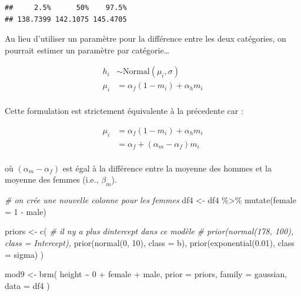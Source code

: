 \documentclass[
  a4paper,11pt,twoside,onecolumn,openright,final,oldfontcommands]{memoir}
\newenvironment{Shaded}{\begin{snugshade}}{\end{snugshade}}
\newcommand{\AttributeTok}[1]{\textcolor[rgb]{0.77,0.63,0.00}{#1}}
\newcommand{\CommentTok}[1]{\textcolor[rgb]{0.56,0.35,0.01}{\textit{#1}}}
\newcommand{\DecValTok}[1]{\textcolor[rgb]{0.00,0.00,0.81}{#1}}
\newcommand{\FloatTok}[1]{\textcolor[rgb]{0.00,0.00,0.81}{#1}}
\newcommand{\FunctionTok}[1]{\textcolor[rgb]{0.00,0.00,0.00}{#1}}
\newcommand{\NormalTok}[1]{#1}
\newcommand{\OtherTok}[1]{\textcolor[rgb]{0.56,0.35,0.01}{#1}}
\newcommand{\SpecialCharTok}[1]{\textcolor[rgb]{0.00,0.00,0.00}{#1}}
\theoremstyle{definition}
\theoremstyle{definition}
\theoremstyle{definition}
\theoremstyle{remark}
\begin{document}
\begin{verbatim}
##     2.5%      50%    97.5% 
## 138.7399 142.1075 145.4705
\end{verbatim}

Au lieu d'utiliser un paramètre pour la différence entre les deux catégories, on pourrait estimer un paramètre par catégorie\ldots{}

\[
\begin{aligned}
h_{i} &\sim \mathrm{Normal}(\mu_{i}, \sigma) \\
\mu_{i} &= \alpha_{f}(1 - m_{i}) + \alpha_{h} m_{i} \\
\end{aligned}
\]

Cette formulation est strictement équivalente à la précedente car :

\[
\begin{aligned}
\mu_{i} &= \alpha_{f}(1 - m_{i}) + \alpha_{h} m_{i} \\
&= \alpha_{f} + (\alpha_{m} - \alpha_{f}) m_{i} \\
\end{aligned}
\]

où \((\alpha_{m} - \alpha_{f})\) est égal à la différence entre la moyenne des hommes et la moyenne des femmes (i.e., \(\beta_{m}\)).

\begin{Shaded}
\begin{Highlighting}[]
\CommentTok{\# on crée une nouvelle colonne pour les femmes}
\NormalTok{df4 }\OtherTok{\textless{}{-}}\NormalTok{ df4 }\SpecialCharTok{\%\textgreater{}\%} \FunctionTok{mutate}\NormalTok{(}\AttributeTok{female =} \DecValTok{1} \SpecialCharTok{{-}}\NormalTok{ male)}

\NormalTok{priors }\OtherTok{\textless{}{-}} \FunctionTok{c}\NormalTok{(}
  \CommentTok{\# il n\textquotesingle{}y a plus d\textquotesingle{}intercept dans ce modèle}
  \CommentTok{\# prior(normal(178, 100), class = Intercept),}
  \FunctionTok{prior}\NormalTok{(}\FunctionTok{normal}\NormalTok{(}\DecValTok{0}\NormalTok{, }\DecValTok{10}\NormalTok{), }\AttributeTok{class =}\NormalTok{ b),}
  \FunctionTok{prior}\NormalTok{(}\FunctionTok{exponential}\NormalTok{(}\FloatTok{0.01}\NormalTok{), }\AttributeTok{class =}\NormalTok{ sigma)}
\NormalTok{  )}

\NormalTok{mod9 }\OtherTok{\textless{}{-}} \FunctionTok{brm}\NormalTok{(}
\NormalTok{  height }\SpecialCharTok{\textasciitilde{}} \DecValTok{0} \SpecialCharTok{+}\NormalTok{ female }\SpecialCharTok{+}\NormalTok{ male,}
  \AttributeTok{prior =}\NormalTok{ priors,}
  \AttributeTok{family =}\NormalTok{ gaussian,}
  \AttributeTok{data =}\NormalTok{ df4}
\NormalTok{  )}
\end{Highlighting}
\end{Shaded}
\end{document}
